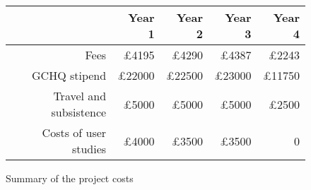 \documentclass[10pt]{article}
\begin{document}
\begin{figure}[h!t]
\begin{center}
\begin{tabular}{|r|r|r|r|r|}
\hline 
& {\bf Year 1} &{\bf Year 2}&{\bf Year 3}&{\bf Year 4}\\
\hline
Fees & \pounds4195 & \pounds4290 & \pounds4387 & \pounds2243 \\
\hline
GCHQ stipend & \pounds22000 & \pounds22500 & \pounds23000 & \pounds11750 \\
\hline
Travel and subsistence & \pounds5000 & \pounds5000 & \pounds5000 & \pounds2500 \\
\hline
Costs of user studies & \pounds4000 & \pounds3500 & \pounds3500 & 0 \\
\hline
\end{tabular}
\end{center}
\caption{Summary of the project costs}
\label{fig:costs}
\end{figure}

%
%
%
%
\small


\end{document}
